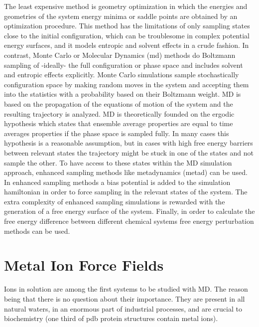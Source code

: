 The least expensive method is geometry optimization in which the energies and geometries of the 
system energy minima or saddle points are obtained by an optimization procedure. This method 
has the limitations of only sampling states close to the initial configuration, which can be 
troublesome in complex potential energy surfaces, and it models entropic and solvent effects 
in a crude fashion\cite{Cramer2004_v2}. In contrast,  Monte Carlo or Molecular Dynamics 
(\gls{md})
methods do Boltzmann sampling of -ideally- the full configuration or phase space and includes 
solvent and 
entropic effects explicitly. Monte Carlo simulations sample stochastically configuration space 
by making random moves in the system and accepting them into the statistics with a probability 
based on their Boltzmann weight\cite{frenkel2001understanding}. MD is based on 
the propagation of the equations of motion of the system and the resulting trajectory is 
analyzed. MD is theoretically founded on the ergodic hypothesis which states 
that ensemble average properties are equal to time averages properties if the phase space is 
sampled fully.\cite{Smith2014} In many cases this hypothesis is a reasonable assumption, but in 
cases with high free energy barriers between relevant states the trajectory might 
be stuck in one of the states and not sample the other. To have access to these states within 
the MD simulation approach, enhanced sampling methods like 
metadynamics (\gls{metad})\cite{Valsson2016,bussi2015free} can be used. In enhanced sampling 
methods 
a bias potential is added to the simulation hamiltonian in order to force sampling in the 
relevant states of the system. The extra complexity of enhanced sampling simulations is 
rewarded with the generation of a free energy surface of the system. Finally, in order to 
calculate the free energy difference between different chemical systems free energy 
perturbation methods can be used\cite{Shirts2013_v2}. 





\section{Metal Ion Force Fields}\label{sec:MIFF}

Ions in solution are among the first systems to be studied with MD. 
The reason being that there is no question about their importance. They 
are present in all natural waters, in an enormous part of industrial processes, and are crucial to 
biochemistry (one third of pdb protein structures contain metal ions\cite{solomon1996volume}).

